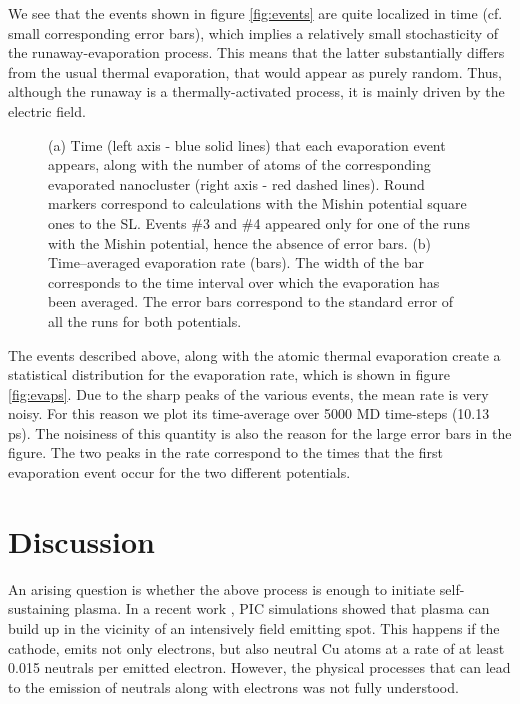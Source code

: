 \documentclass[%
 aps,
 prb,%
 amsmath,amssymb,
reprint,%
superscriptaddress,
]{revtex4-1}
\begin{document}
We see that the events shown in figure \ref{fig:events} are quite localized in time (cf. small corresponding error bars), which implies a relatively small stochasticity of the runaway-evaporation process.
This means that the latter substantially differs from the usual thermal evaporation, that would appear as purely random.
Thus, although the runaway is a thermally-activated process, it is mainly driven by the electric field.


\begin{figure}[h]
	\centering


	\caption{\label{fig:stats} (a) Time (left axis - blue solid lines) that each evaporation event appears, along with the number of atoms of the corresponding evaporated nanocluster (right axis - red dashed lines). Round markers correspond to calculations with the Mishin potential square ones to the SL. Events \#3 and \#4 appeared only for one of the runs with the Mishin potential, hence the absence of error bars. (b) Time--averaged evaporation rate (bars). The width of the bar corresponds to the time interval over which the evaporation has been averaged. The error bars correspond to the standard error of all the runs for both potentials.}
\end{figure}

The events described above, along with the atomic thermal evaporation create a statistical distribution for the evaporation rate, which is shown in figure \ref{fig:evaps}. Due to the sharp peaks of the various events, the mean rate is very noisy. For this reason we plot its time-average over 5000 MD time-steps (10.13 ps). The noisiness of this quantity is also the reason for the large error bars in the figure. The two peaks in the rate correspond to the times that the first evaporation event occur for the two different potentials.
 

\section{Discussion} 

An arising question is whether the above process is enough to initiate self-sustaining plasma.
In a recent work \cite{ArcPIC_1d,arcPIC}, PIC simulations showed that plasma can build up in the vicinity of an intensively field emitting spot.
This happens if the cathode, emits not only electrons, but also neutral Cu atoms at a rate of at least 0.015 neutrals per emitted electron.
However, the physical processes that can lead to the emission of neutrals along with electrons was not fully understood. 
\end{document}
